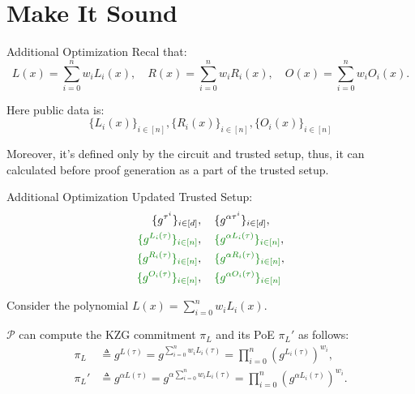 \documentclass{zkdl-presentation-template}
\begin{document}
    \section{Make It Sound}

    \begin{frame}{Additional Optimization}
        Recal that:
        \begin{equation*}
            L(x) = \sum_{i=0}^n w_iL_i(x), \quad R(x) = \sum_{i=0}^n w_i R_i(x), \quad O(x) = \sum_{i=0}^n w_iO_i(x).
        \end{equation*}

        

        Here public data is:
        \begin{equation*}
            \{L_i(x)\}_{i \in [n]}, \{R_i(x)\}_{i \in [n]}, \{O_i(x)\}_{i \in [n]}
        \end{equation*}

        
        
        Moreover, it's defined only by the circuit and trusted setup, thus, it can calculated before proof generation as a part of the trusted setup.
    \end{frame}

    \begin{frame}{Additional Optimization}
        Updated Trusted Setup:
        \vspace{-10pt}
        {\scriptsize \begin{align*}
            \{g^{\tau^i}\}_{i \in [d]}&, \quad \{g^{\alpha \tau^i}\}_{i \in [d]}, \\
            \textcolor{green!50!black}{\{g^{L_i(\tau)}\}_{i \in [n]}}&, \quad \textcolor{green!50!black}{\{g^{\alpha L_i(\tau)}\}_{i \in [n]}},\\ 
            \textcolor{green!50!black}{\{g^{R_i(\tau)}\}_{i \in [n]}}&, \quad \textcolor{green!50!black}{\{g^{\alpha R_i(\tau)}\}_{i \in [n]}},\\
            \textcolor{green!50!black}{\{g^{O_i(\tau)}\}_{i \in [n]}}&, \quad \textcolor{green!50!black}{\{g^{\alpha O_i(\tau)}\}_{i \in [n]}}  
        \end{align*}}
       
        
        
        Consider the polynomial $L(x) = \sum_{i=0}^n w_iL_i(x)$. 
        
        
        
        $\mathcal{P}$ can compute the KZG commitment $\pi_L$ and its PoE $\pi_L'$ as follows:
        \begin{align*}
            \pi_L &\triangleq g^{L(\tau)} = g^{\sum_{i=0}^n w_i L_i(\tau)} = \prod_{i=0}^n (g^{L_i(\tau)})^{w_i}, \\
            \pi_L' &\triangleq g^{\alpha L(\tau)} = g^{\alpha \sum_{i=0}^n w_i L_i(\tau)} = \prod_{i=0}^n (g^{\alpha L_i(\tau)})^{w_i}.
        \end{align*}
    \end{frame}
\end{document}
